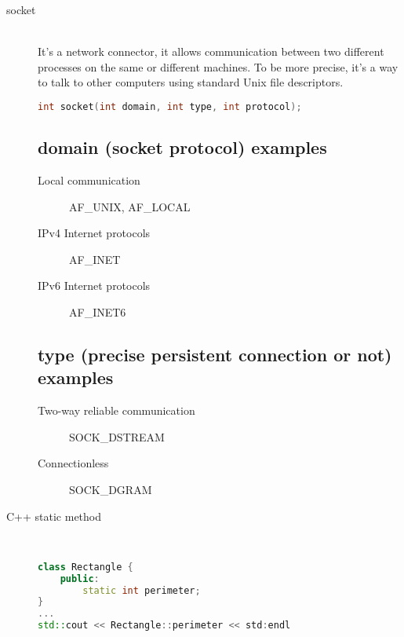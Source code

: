 \documentclass{article}
\begin{document}
\begin{description}
    \item[socket] \mbox{}\\
    It's a network connector, it allows communication between two different processes on the same or different machines. To be more precise, it's a way to talk to other computers using standard Unix file descriptors.

\begin{lstlisting}[language=C++]
int socket(int domain, int type, int protocol);
\end{lstlisting}

    \subsection{domain (socket protocol) examples}
    \begin{description}
        \item[Local communication] AF\_UNIX, AF\_LOCAL
        \item[IPv4 Internet protocols] AF\_INET
        \item[IPv6 Internet protocols] AF\_INET6
    \end{description}

    \subsection{type (precise persistent connection or not) examples}
    \begin{description}
        \item[Two-way reliable communication] SOCK\_DSTREAM
        \item[Connectionless] SOCK\_DGRAM
    \end{description}

    \item[C++ static method] \mbox{}\\
\begin{lstlisting}[language=C++]
class Rectangle {
    public:
        static int perimeter;
}
...
std::cout << Rectangle::perimeter << std:endl
\end{lstlisting} 
     

\end{description}
\end{document}
